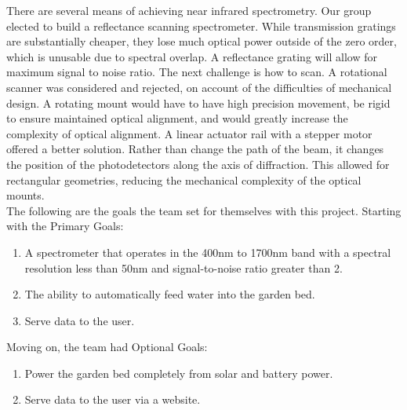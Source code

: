 \documentclass[journal]{IEEEtran}
\begin{document}
There are several means of achieving near infrared spectrometry. Our group elected to build a reflectance 
scanning spectrometer. While transmission gratings are substantially cheaper, they lose much optical power 
outside of the zero order, which is unusable due to spectral overlap. A reflectance grating will allow for 
maximum signal to noise ratio. The next challenge is how to scan. A rotational scanner was considered and 
rejected, on account of the difficulties of mechanical design. A rotating mount would have to have high 
precision movement, be rigid to ensure maintained optical alignment, and would greatly increase the 
complexity of optical alignment. A linear actuator rail with a stepper motor offered a better solution. 
Rather than change the path of the beam, it changes the position of the photodetectors along the axis of 
diffraction. This allowed for rectangular geometries, reducing the mechanical complexity of the optical 
mounts.\\

The following are the goals the team set for themselves with this project. Starting with the Primary Goals:
\begin{enumerate}
   \item A spectrometer that operates in the 400nm to 1700nm band with a spectral resolution less
         than 50nm and signal-to-noise ratio greater than 2.
   \item The ability to automatically feed water into the garden bed.
   \item Serve data to the user.
\end{enumerate}
Moving on, the team had Optional Goals:
\begin{enumerate}
   \item Power the garden bed completely from solar and battery power.
   \item Serve data to the user via a website.
\end{enumerate}
\end{document}
